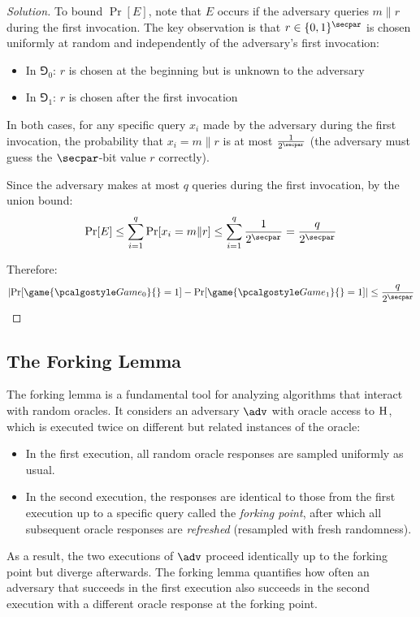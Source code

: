 \begin{proof}[Solution]
  To bound $\Pr[E]$, note that $E$ occurs if the adversary queries $m \| r$ during the first invocation. The key observation is that $r \in \{0,1\}^\secpar$ is chosen uniformly at random and independently of the adversary's first invocation:
  \begin{itemize}
    \item In $\Game_0$: $r$ is chosen at the beginning but is unknown to the adversary
    \item In $\Game_1$: $r$ is chosen after the first invocation
  \end{itemize}
  
  In both cases, for any specific query $x_i$ made by the adversary during the first invocation, the probability that $x_i = m \| r$ is at most $\frac{1}{2^\secpar}$ (the adversary must guess the $\secpar$-bit value $r$ correctly).
  
  Since the adversary makes at most $q$ queries during the first invocation, by the union bound:
  \[
  \Pr[E] \leq \sum_{i=1}^q \Pr[x_i = m \| r] \leq \sum_{i=1}^q \frac{1}{2^\secpar} = \frac{q}{2^\secpar}
  \]
  
  Therefore:
  \[
  \left|\Pr[\game{\Game_0}{} = 1] - \Pr[\game{\Game_1}{} = 1]\right| \leq \frac{q}{2^\secpar}
  \]
\end{proof}

\subsection{The Forking Lemma}

The forking lemma is a fundamental tool for analyzing algorithms that interact with random oracles. It considers an adversary $\adv$ with oracle access to ${\normalfont\textsc{H}}$, which is executed twice on different but related instances of the oracle:

\begin{itemize}
  \item In the first execution, all random oracle responses are sampled uniformly as usual.
  \item In the second execution, the responses are identical to those from the first execution up to a specific query called the \emph{forking point}, after which all subsequent oracle responses are \emph{refreshed} (resampled with fresh randomness).
\end{itemize}

As a result, the two executions of $\adv$ proceed identically up to the forking point but diverge afterwards. The forking lemma quantifies how often an adversary that succeeds in the first execution also succeeds in the second execution with a different oracle response at the forking point.

